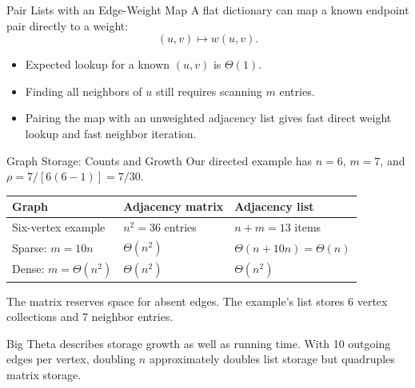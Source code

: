 \documentclass[aspectratio=169,11pt]{beamer}
\begin{document}
\begin{frame}{Pair Lists with an Edge-Weight Map}
  A flat dictionary can map a known endpoint pair directly to a weight:
  \[
    (u,v)\longmapsto w(u,v).
  \]

  \vspace{0.6em}
  \begin{itemize}\setlength{\itemsep}{0.75em}
    \item Expected lookup for a known $(u,v)$ is $\Theta(1)$.
    \item Finding all neighbors of $u$ still requires scanning $m$ entries.
    \item Pairing the map with an unweighted adjacency list gives fast direct
      weight lookup and fast neighbor iteration.
  \end{itemize}

\end{frame}

\begin{frame}{Graph Storage: Counts and Growth}
  Our directed example has $n=6$, $m=7$, and
  $\rho=7/[6(6-1)]=7/30$.

  \vspace{0.7em}
  \renewcommand{\arraystretch}{1.25}
  \begin{tabularx}{\textwidth}{Xll}
    \toprule
    \textbf{Graph} & \textbf{Adjacency matrix} & \textbf{Adjacency list} \\
    \midrule
    Six-vertex example & $n^2=36$ entries & $n+m=13$ items \\
    Sparse: $m=10n$ & $\Theta(n^2)$ & $\Theta(n+10n)=\Theta(n)$ \\
    Dense: $m=\Theta(n^2)$ & $\Theta(n^2)$ & $\Theta(n^2)$ \\
    \bottomrule
  \end{tabularx}

  \vspace{0.8em}
  The matrix reserves space for absent edges. The example's list stores
  6 vertex collections and 7 neighbor entries.

  \vspace{0.6em}
  Big Theta describes storage growth as well as running time. With 10 outgoing
  edges per vertex, doubling $n$ approximately doubles list storage but quadruples
  matrix storage.
\end{frame}

\end{document}

